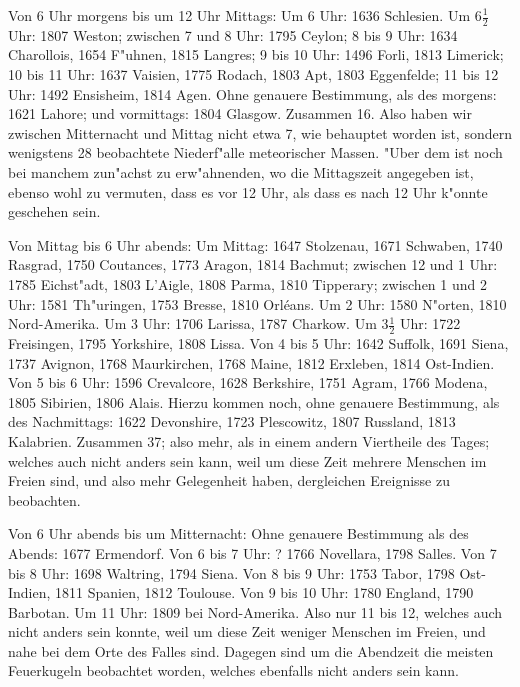 \documentclass[a4paper, 11pt, oneside, polutonikogreek, german]{article}
\begin{document}
Von 6 Uhr morgens bis um 12 Uhr Mittags: Um 6 Uhr: 1636 Schlesien. Um $\mathfrak{6\frac{1}{2}}$ Uhr: 1807 Weston; zwischen 7 und 8 Uhr: 1795 Ceylon; 8 bis 9 Uhr: 1634 Charollois, 1654 F"uhnen, 1815 Langres; 9 bis 10 Uhr: 1496 Forli, 1813 Limerick; 10 bis 11 Uhr: 1637 Vaisien, 1775 Rodach, 1803 Apt, 1803 Eggenfelde; 11 bis 12 Uhr: 1492 Ensisheim, 1814 Agen. Ohne genauere Bestimmung, als des morgens: 1621 Lahore; und vormittags: 1804 Glasgow. Zusammen 16. Also haben wir zwischen Mitternacht und Mittag nicht etwa 7, wie behauptet worden ist, sondern wenigstens 28 beobachtete Niederf"alle meteorischer Massen. "Uber dem ist noch bei manchem zun"achst zu erw"ahnenden, wo die Mittagszeit angegeben ist, ebenso wohl zu vermuten, dass es vor 12 Uhr, als dass es nach 12 Uhr k"onnte geschehen sein.

Von Mittag bis 6 Uhr abends: Um Mittag: 1647 Stolzenau, 1671 Schwaben, 1740 Rasgrad, 1750 Coutances, 1773 Aragon, 1814 Bachmut; zwischen 12 und 1 Uhr: 1785 Eichst"adt, 1803 L'Aigle, 1808 Parma, 1810 Tipperary; zwischen 1 und 2 Uhr: 1581 Th"uringen, 1753 Bresse, 1810 Orléans. Um 2 Uhr: 1580 N"orten, 1810 Nord-Amerika. Um 3 Uhr: 1706 Larissa, 1787 Charkow. Um $\mathfrak{3\frac{1}{2}}$ Uhr: 1722 Freisingen, 1795 Yorkshire, 1808 Lissa. Von 4 bis 5 Uhr: 1642 Suffolk, 1691 Siena, 1737 Avignon, 1768 Maurkirchen, 1768 Maine, 1812 Erxleben, 1814 Ost-Indien. Von 5 bis 6 Uhr: 1596 Crevalcore, 1628 Berkshire, 1751 Agram, 1766 Modena, 1805 Sibirien, 1806 Alais. Hierzu kommen noch, ohne genauere Bestimmung, als des Nachmittags: 1622 Devonshire, 1723 Plescowitz, 1807 Russland, 1813 Kalabrien. Zusammen 37; also mehr, als in einem andern Viertheile des Tages; welches auch nicht anders sein kann, weil um diese Zeit mehrere Menschen im Freien sind, und also mehr Gelegenheit haben, dergleichen Ereignisse zu beobachten.

Von 6 Uhr abends bis um Mitternacht: Ohne genauere Bestimmung als des Abends: 1677 Ermendorf. Von 6 bis 7 Uhr: ? 1766 Novellara, 1798 Salles. Von 7 bis 8 Uhr: 1698 Waltring, 1794 Siena. Von 8 bis 9 Uhr: 1753 Tabor, 1798 Ost-Indien, 1811 Spanien, 1812 Toulouse. Von 9 bis 10 Uhr: 1780 England, 1790 Barbotan. Um 11 Uhr: 1809 bei Nord-Amerika. Also nur 11 bis 12, welches auch nicht anders sein konnte, weil um diese Zeit weniger Menschen im Freien, und nahe bei dem Orte des Falles sind. Dagegen sind um die Abendzeit die meisten Feuerkugeln beobachtet worden, welches ebenfalls nicht anders sein kann.
\end{document}
